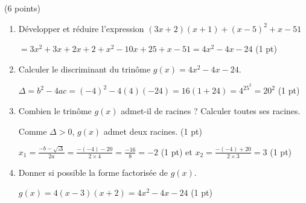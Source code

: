 \documentclass[a4paper,11pt]{article}
\theoremstyle{break}
\begin{document}
  \begin{exo}(6 points)
   \begin{enumerate}
    \item Développer et réduire l'expression $(3x+2)(x+1)+(x-5)^2+x-51$
    
\begin{correction}
    
   $=3x^2+3x+2x+2+x^2-10x+25+x-51=4x^2-4x-24$ (1 pt)

\end{correction}

    
    \item Calculer le discriminant du trinôme $g(x)=4x^2-4x-24$.
    
\begin{correction}
 
 $\Delta=b^2-4ac=(-4)^2-4(4)(-24)=16(1+24)=4^25^2=20^2$ (1 pt)
 
 
\end{correction}
    
    
    \item Combien le trinôme $g(x)$ admet-il de racines ? Calculer toutes ses racines.

\begin{correction}
 
 Comme $\Delta>0$, $g(x)$ admet deux racines. (1 pt)
    
    $x_1=\frac{-b-\sqrt{\Delta}}{2a}=\frac{-(-4)-20}{2 \times 4}=\frac{-16}{8}=-2$ (1 pt)
    et 
    $x_2=\frac{-(-4)+20}{2 \times 3}=3$ (1 pt)
 
\end{correction}

    \item Donner si possible la forme factorisée de $g(x)$.
    
\begin{correction}
 
$g(x)=4(x-3)(x+2)=4x^2-4x-24$ (1 pt)


 
\end{correction}


\end{enumerate}
\end{exo}

  \vspace{0.5cm}
  ~
  
\end{document}
